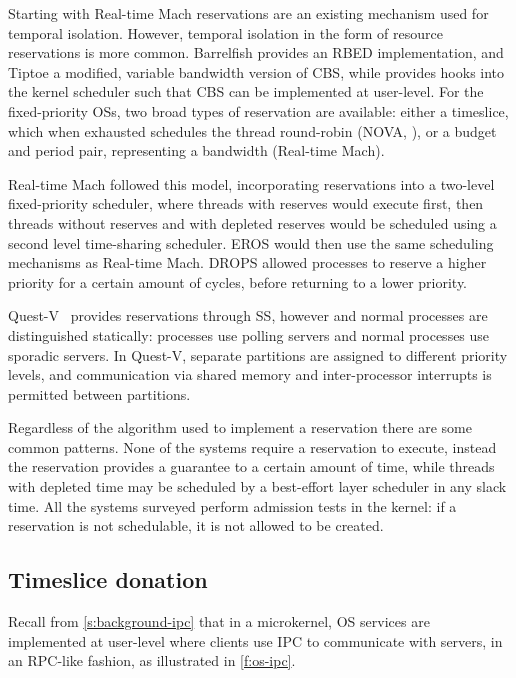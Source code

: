Starting with Real-time Mach reservations are an existing mechanism used for temporal isolation.
However, temporal isolation in the form of resource reservations is more common. Barrelfish provides
an \gls{RBED} implementation, and Tiptoe a modified, variable bandwidth version of \gls{CBS}, while \minix provides hooks into the kernel
scheduler such that CBS can be implemented at user-level. For the fixed-priority \glspl{OS}, two broad
types of reservation are available: either a timeslice, which when exhausted schedules the thread
round-robin (NOVA, \fiascooc), or a budget and period pair, representing a bandwidth (Real-time Mach). 

Real-time Mach followed this model, incorporating reservations into a two-level fixed-priority
scheduler, where threads with
reserves would execute first, then threads without reserves and with
depleted reserves would be scheduled using a second level time-sharing scheduler. EROS would then
use the same scheduling mechanisms as Real-time Mach. \gls{DROPS} allowed processes to reserve a 
higher priority for a certain amount of cycles, before returning to a lower priority.

Quest-V~\citep{Danish_LW_11} provides reservations through \gls{SS}, however \IO and normal processes
are distinguished statically: \IO processes use polling servers and normal processes use sporadic
servers. In Quest-V, separate partitions are assigned to
different priority levels, and communication via shared memory and inter-processor interrupts 
is permitted between partitions.

Regardless of the algorithm used to implement a reservation there are some common patterns.  None of
the systems require a reservation to execute, instead the reservation provides a guarantee to a
certain amount of time, while threads with depleted time may be scheduled by a best-effort layer
scheduler in any slack time. All the systems surveyed perform admission tests in the kernel: if a
reservation is not schedulable, it is not allowed to be created. 

\subsection{Timeslice donation}

Recall from \cref{s:background-ipc} that in a microkernel, \gls{OS} services are implemented at
user-level where clients use \gls{IPC} to communicate with servers, in an \gls{RPC}-like fashion, as
illustrated in \cref{f:os-ipc}.

